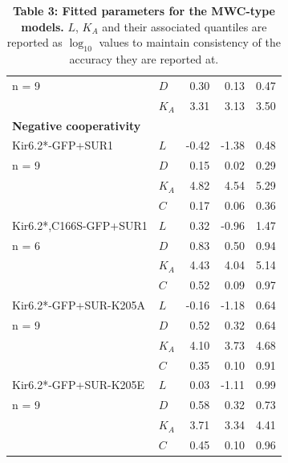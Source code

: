 \documentclass[10pt,lineno, doublespacing]{elife}
\begin{document}
\begin{table}
\begin{tabular}{l l r r r}
n = 9                  & $D$     & 0.30  & 0.13  & 0.47 \\
                       & $K_{A}$ & 3.31  & 3.13  & 3.50 \\
\cmidrule{2-5}
\textbf{Negative cooperativity} & & & & \\
\midrule
Kir6.2*-GFP+SUR1       & $L$     & -0.42 & -1.38 & 0.48  \\
n = 9                  & $D$     & 0.15  & 0.02  & 0.29  \\
                       & $K_{A}$ & 4.82  & 4.54  & 5.29  \\
                       & $C$     & 0.17  & 0.06  & 0.36  \\
\cmidrule{2-5}
Kir6.2*,C166S-GFP+SUR1 & $L$     & 0.32 & -0.96 & 1.47 \\
n = 6                  & $D$     & 0.83 & 0.50  & 0.94 \\
                       & $K_{A}$ & 4.43 & 4.04  & 5.14 \\
                       & $C$     & 0.52 & 0.09  & 0.97 \\
\cmidrule{2-5}
Kir6.2*-GFP+SUR-K205A  & $L$     & -0.16 & -1.18 & 0.64 \\
n = 9                  & $D$     & 0.52  & 0.32  & 0.64 \\
                       & $K_{A}$ & 4.10  & 3.73  & 4.68 \\
                       & $C$     & 0.35  & 0.10  & 0.91 \\
\cmidrule{2-5}
Kir6.2*-GFP+SUR-K205E  & $L$     & 0.03  & -1.11 & 0.99 \\
n = 9                  & $D$     & 0.58  & 0.32  & 0.73 \\
                       & $K_{A}$ & 3.71  & 3.34  & 4.41 \\
                       & $C$     & 0.45  & 0.10  & 0.96 \\
\midrule
\end{tabular}
\caption{\label{table:mwc} \textbf{Table 3: Fitted parameters for the MWC-type models.} $L$, $K_A$ and their associated quantiles are reported as $\log_{10}$ values to maintain consistency of the accuracy they are reported at.}
\endgroup{}
\end{table}

\FloatBarrier
\end{document}
